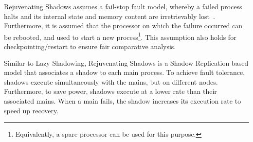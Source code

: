 

Rejuvenating Shadows assumes a fail-stop fault model, whereby a failed process halts and its internal state and memory content are irretrievably lost~\cite{Schlichting1983}. Furthermore, it is assumed that the processor on which the failure occurred can be rebooted, and used to start a new process\footnote{Equivalently, a spare processor can be used for this purpose.}. This assumption also holds for checkpointing/restart to ensure fair comparative analysis. 
 

Similar to Lazy Shadowing, Rejuvenating Shadows is a Shadow Replication based model that associates a shadow to each main process. To achieve fault tolerance, shadows execute simultaneously with the mains, but on different nodes. Furthermore, to save power, shadows execute at a lower rate than their associated mains.  When a main fails, the shadow increases its execution rate to speed up recovery. %


